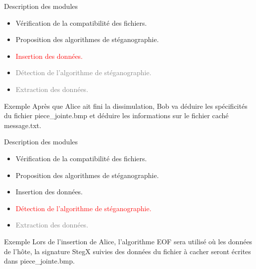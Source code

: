 \documentclass{beamer}
\begin{document}
  \begin{frame} %
	\begin{block}{Description des modules}
	\begin{itemize}
	[circle]
	\item Vérification de la compatibilité des fichiers.
	\item Proposition des algorithmes de stéganographie.
	\item \textcolor{red} {Insertion des données.}
	\item \textcolor{gray} {Détection de l'algorithme de stéganographie.}
	\item \textcolor{gray} {Extraction des données.}
	\end{itemize}
	\end{block}
	
	\begin{exampleblock}{Exemple} 
	Après que Alice ait fini la dissimulation, Bob va déduire les spécificités
	du fichier piece\_jointe.bmp et déduire les informations sur le fichier 
	caché message.txt. 
	\end{exampleblock}
  \end{frame}
  
  \begin{frame} %
	\begin{block}{Description des modules}
	\begin{itemize}
	[circle]
	\item Vérification de la compatibilité des fichiers.
	\item Proposition des algorithmes de stéganographie.
	\item Insertion des données.
	\item \textcolor{red} {Détection de l'algorithme de stéganographie.}
	\item \textcolor{gray} {Extraction des données.}
	\end{itemize}
	\end{block}
	
	\begin{exampleblock}{Exemple} 
	Lors de l'insertion de Alice, l'algorithme EOF sera utilisé où 
	les données de l'hôte, la signature StegX suivies des données du fichier 
	à cacher seront écrites dans piece\_jointe.bmp. 
	\end{exampleblock}
  \end{frame}
  
\end{document}
